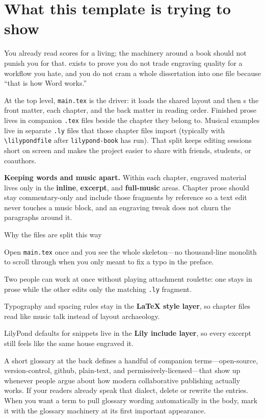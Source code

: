 \section{What this template is trying to show}

You already read scores for a living; the machinery around a book should not punish you for that. \ProjectName exists to prove you do not trade engraving quality for a workflow you hate, and you do not cram a whole dissertation into one file because ``that is how Word works.''

At the top level, \verb|main.tex| is the driver: it loads the shared layout and then \verb||s the front matter, each chapter, and the back matter in reading order. Finished prose lives in companion \verb|.tex| files beside the chapter they belong to. Musical examples live in separate \verb|.ly| files that those chapter files import (typically with \verb|\lilypondfile| after \verb|lilypond-book| has run). That split keeps editing sessions short on screen and makes the project easier to share with friends, students, or coauthors.

\textbf{Keeping words and music apart.} Within each chapter, engraved material lives only in the \textbf{inline}, \textbf{excerpt}, and \textbf{full-music} areas. Chapter prose should stay commentary-only and include those fragments by reference so a text edit never touches a music block, and an engraving tweak does not churn the paragraphs around it.

\begin{bookStyledBulletList}{Why the files are split this way}
\item Open \verb|main.tex| once and you see the whole skeleton---no thousand-line monolith to scroll through when you only meant to fix a typo in the preface.
\item Two people can work at once without playing attachment roulette: one stays in prose while the other edits only the matching \verb|.ly| fragment.
\item Typography and spacing rules stay in the \textbf{LaTeX style layer}, so chapter files read like music talk instead of layout archaeology.
\item LilyPond defaults for snippets live in the \textbf{Lily include layer}, so every excerpt still feels like the same house engraved it.
\end{bookStyledBulletList}

A short glossary at the back defines a handful of companion terms---\gls{open-source}, \gls{version-control}, \gls{github}, \gls{plain-text}, and \gls{permissively-licensed}---that show up whenever people argue about how modern collaborative publishing actually works. If your readers already speak that dialect, delete or rewrite the entries. When you want a term to pull glossary wording automatically in the body, mark it with the glossary machinery at its first important appearance.
